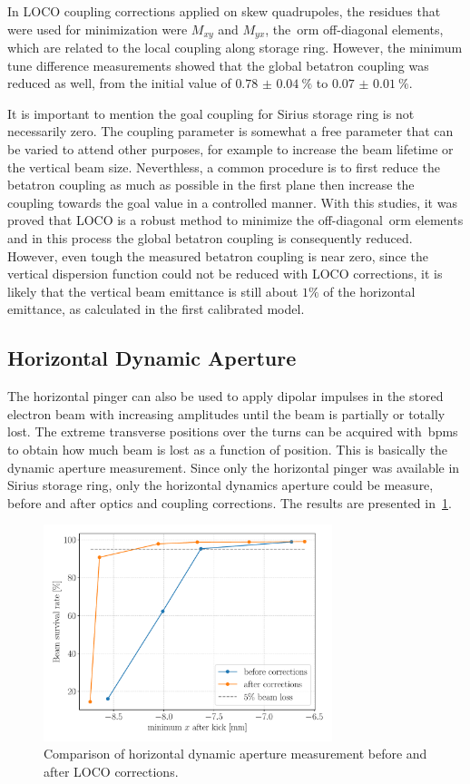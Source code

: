 In LOCO coupling corrections applied on skew quadrupoles, the residues that were used for minimization were $M_{xy}$ and $M_{yx}$, the~\gls{orm} off-diagonal elements, which are related to the local coupling along storage ring. However, the minimum tune difference measurements showed that the global betatron coupling was reduced as well, from the initial value of $\SI{0.78(4)}{\%}$ to $\SI{0.07(1)}{\%}$.

It is important to mention the goal coupling for Sirius storage ring is not necessarily zero. The coupling parameter is somewhat a free parameter that can be varied to attend other purposes, for example to increase the beam lifetime or the vertical beam size. Neverthless, a common procedure is to first reduce the betatron coupling as much as possible in the first plane then increase the coupling towards the goal value in a controlled manner. With this studies, it was proved that LOCO is a robust method to minimize the off-diagonal~\gls{orm} elements and in this process the global betatron coupling is consequently reduced. However, even tough the measured betatron coupling is near zero, since the vertical dispersion function could not be reduced with LOCO corrections, it is likely that the vertical beam emittance is still about $1\%$ of the horizontal emittance, as calculated in the first calibrated model.

\subsection{Horizontal Dynamic Aperture}

The horizontal pinger can also be used to apply dipolar impulses in the stored electron beam with increasing amplitudes until the beam is partially or totally lost. The extreme transverse positions over the turns can be acquired with~\glspl{bpm} to obtain how much beam is lost as a function of position. This is basically the dynamic aperture measurement. Since only the horizontal pinger was available in Sirius storage ring, only the horizontal dynamics aperture could be measure, before and after optics and coupling corrections. The results are presented in~\ref{fig:xdynap}.
\begin{figure}
\centering
\includegraphics[width=0.75\textwidth]{figures/xdynamic_aperture_grid.pdf}
\caption{Comparison of horizontal dynamic aperture measurement before and after LOCO corrections.}
\label{fig:xdynap}
\end{figure}


